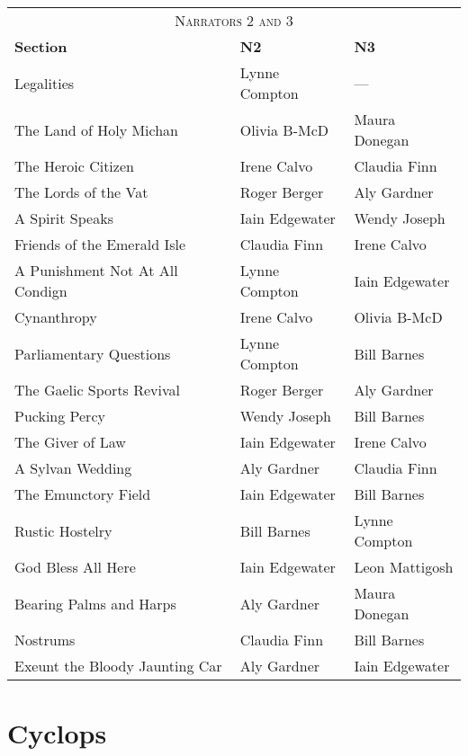 \bigskip

\begin{tabular}{lll}
    \multicolumn{3}{c}{\Large \textsc{Narrators 2 and 3}} \\
\textbf{Section}                    & \textbf{N2}       & \textbf{N3} \\
Legalities                          & Lynne Compton     & --- \\
The Land of Holy Michan             & Olivia B-McD      & Maura Donegan \\
The Heroic Citizen                  & Irene Calvo       & Claudia Finn \\
The Lords of the Vat                & Roger Berger      & Aly Gardner \\
A Spirit Speaks                     & Iain Edgewater    & Wendy Joseph \\
Friends of the Emerald Isle         & Claudia Finn      & Irene Calvo \\
A Punishment Not At All Condign     & Lynne Compton     & Iain Edgewater \\
Cynanthropy                         & Irene Calvo       & Olivia B-McD \\
Parliamentary Questions             & Lynne Compton     & Bill Barnes \\
The Gaelic Sports Revival           & Roger Berger      & Aly Gardner \\
Pucking Percy                       & Wendy Joseph      & Bill Barnes \\
The Giver of Law                    & Iain Edgewater    & Irene Calvo \\
A Sylvan Wedding                    & Aly Gardner       & Claudia Finn \\
The Emunctory Field                 & Iain Edgewater    & Bill Barnes \\
Rustic Hostelry                     & Bill Barnes       & Lynne Compton \\
God Bless All Here                  & Iain Edgewater    & Leon Mattigosh \\
Bearing Palms and Harps             & Aly Gardner       & Maura Donegan \\
Nostrums                            & Claudia Finn      & Bill Barnes \\
Exeunt the Bloody Jaunting Car      & Aly Gardner       & Iain Edgewater \\
\end{tabular}

\newpage



\section*{Cyclops}




